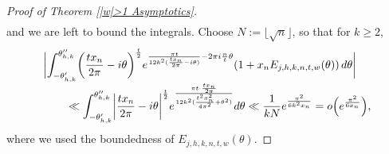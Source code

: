 \documentclass[11pt]{article}
\numberwithin{equation}{section}
\begin{document}
\begin{proof}[Proof of Theorem \ref{|w|>1 Asymptotics}]
\begin{align}
 \end{align}
and we are left to bound the integrals. Choose $N:=\lfloor \sqrt{n} \rfloor$, so that for $k \geq 2$,{\samepage
\begin{align*}
 & \biggl|
 \int_{-\theta_{h,k}'}^{\theta_{h,k}''} \biggl(\frac{tx_n}{2\pi}-{\rm i}\theta\biggr)^{\frac{t}{2}}{\rm e}^{\frac{\pi t}{12k^2(\frac{tx_n}{2\pi}-{\rm i}\theta)}-2\pi {\rm i} \frac{n}{t} \theta} (1+x_n E_{j,h,k,n,t,w}(\theta)) \,{\rm d}\theta \biggr| \\[-1mm]
 &\qquad{} \ll \int_{-\theta_{h,k}'}^{\theta_{h,k}''} \biggl|\frac{tx_n}{2\pi}-{\rm i}\theta \biggr|^{\frac{t}{2}} {\rm e}^{\frac{\pi t \cdot \frac{tx_n}{2\pi}}{12k^2(\frac{t^2x_n^2}{4\pi^2}+\theta^2)}} {\rm d}\theta
 \ll \frac{1}{kN}{\rm e}^{\frac{\pi^2}{6k^2x_n}}
 =o\Bigl({\rm e}^{\frac{\pi^2}{6x_n}}\Bigr),
\end{align*}
where we used the boundedness of $E_{j,h,k,n,t,w}(\theta)$.}


\end{proof}
\end{document}
